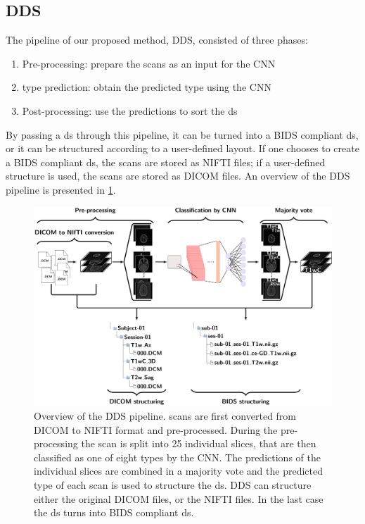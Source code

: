 \begin{samepage}
\subsection{\gls{DDS}}
The pipeline of our proposed method, \gls{DDS}, consisted of three phases:
\begin{enumerate}
    \item Pre-processing: prepare the \glspl{scan} as an input for the \gls{CNN}
    \item \Gls{type} prediction: obtain the predicted \gls{type} using the \gls{CNN}
    \item Post-processing: use the predictions to sort the \gls{ds}
\end{enumerate}

By passing a \gls{ds} through this pipeline, it can be turned into a \gls{BIDS} compliant \gls{ds}, or it can be structured according to a user-defined layout.
If one chooses to create a \gls{BIDS} compliant \gls{ds}, the \glspl{scan} are stored as \gls{NIFTI} files; if a user-defined structure is used, the \glspl{scan} are stored as \gls{DICOM} files.
An overview of the \gls{DDS} pipeline is presented in \cref{fig:DDS_pipeline}.

\begin{figure}
\centering

\includegraphics[width=\textwidth]{Figures/DDS_pipeline.pdf}
\caption{Overview of the \gls{DDS} pipeline.
\Glspl{scan} are first converted from \gls{DICOM} to \gls{NIFTI} format and pre-processed.
During the pre-processing the \gls{scan} is split into 25 individual \glspl{slice}, that are then classified as one of eight \glspl{type} by the \gls{CNN}.
The predictions of the individual \glspl{slice} are combined in a majority vote and the predicted \gls{type} of each \gls{scan} is used to structure the \gls{ds}.
\gls{DDS} can structure either the original \gls{DICOM} files, or the \gls{NIFTI} files.
In the last case the \gls{ds} turns into \gls{BIDS} compliant \gls{ds}.}
\label{fig:DDS_pipeline}

\end{figure}

\end{samepage}

